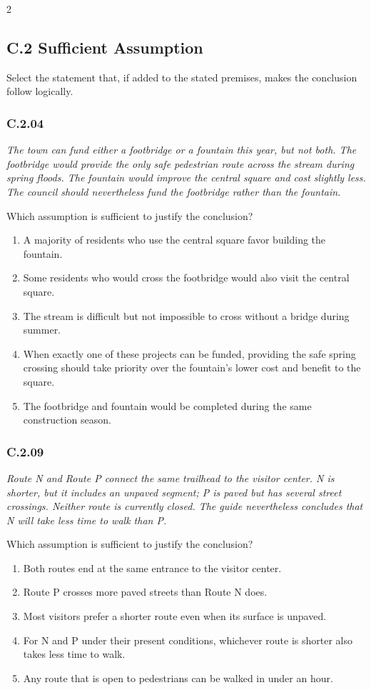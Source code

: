 \documentclass[10pt]{extarticle}
\newcommand{\choice}[1]{\item #1}
\newcommand{\bankitem}[1]{\subsubsection*{#1}}
\begin{document}
\begin{multicols}{2}
\subsection*{C.2 Sufficient Assumption}
Select the statement that, if added to the stated premises, makes the conclusion follow logically.
\begin{samepage}
\bankitem{C.2.04}
\emph{The town can fund either a footbridge or a fountain this year, but not both. The footbridge would provide the only safe pedestrian route across the stream during spring floods. The fountain would improve the central square and cost slightly less. The council should nevertheless fund the footbridge rather than the fountain.}

Which assumption is sufficient to justify the conclusion?
\begin{enumerate}[label=(\alph*)]
  \choice{A majority of residents who use the central square favor building the fountain.}
  \choice{Some residents who would cross the footbridge would also visit the central square.}
  \choice{The stream is difficult but not impossible to cross without a bridge during summer.}
  \choice{When exactly one of these projects can be funded, providing the safe spring crossing should take priority over the fountain's lower cost and benefit to the square.}
  \choice{The footbridge and fountain would be completed during the same construction season.}
\end{enumerate}
\end{samepage}\par\smallskip
\begin{samepage}
\bankitem{C.2.09}
\emph{Route N and Route P connect the same trailhead to the visitor center. N is shorter, but it includes an unpaved segment; P is paved but has several street crossings. Neither route is currently closed. The guide nevertheless concludes that N will take less time to walk than P.}

Which assumption is sufficient to justify the conclusion?
\begin{enumerate}[label=(\alph*)]
  \choice{Both routes end at the same entrance to the visitor center.}
  \choice{Route P crosses more paved streets than Route N does.}
  \choice{Most visitors prefer a shorter route even when its surface is unpaved.}
  \choice{For N and P under their present conditions, whichever route is shorter also takes less time to walk.}
  \choice{Any route that is open to pedestrians can be walked in under an hour.}
\end{enumerate}
\end{samepage}\par\smallskip

\end{multicols}
\end{document}
